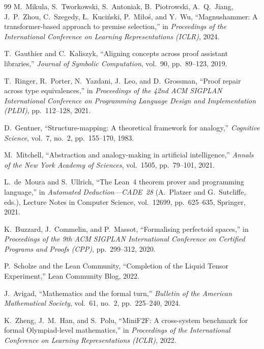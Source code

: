 \documentclass[11pt]{article}
\theoremstyle{definition}
\theoremstyle{remark}
\begin{document}
\begin{thebibliography}{99}
M.~Mikula, S.~Tworkowski, S.~Antoniak, B.~Piotrowski,
A.~Q.~Jiang, J.~P.~Zhou, C.~Szegedy, {\L}.~Kuci\'nski,
P.~Mi{\l}o{\'s}, and Y.~Wu,
``Magnushammer: A transformer-based approach to premise selection,''
in \emph{Proceedings of the International Conference on Learning
Representations (ICLR)}, 2024.

T.~Gauthier and C.~Kaliszyk,
``Aligning concepts across proof assistant libraries,''
\emph{Journal of Symbolic Computation}, vol.~90, pp.~89--123,
2019.

T.~Ringer, R.~Porter, N.~Yazdani, J.~Leo, and D.~Grossman,
``Proof repair across type equivalences,''
in \emph{Proceedings of the 42nd ACM SIGPLAN International
Conference on Programming Language Design and Implementation
(PLDI)}, pp.~112--128, 2021.

D.~Gentner,
``Structure-mapping: A theoretical framework for analogy,''
\emph{Cognitive Science}, vol.~7, no.~2, pp.~155--170, 1983.

M.~Mitchell,
``Abstraction and analogy-making in artificial intelligence,''
\emph{Annals of the New York Academy of Sciences}, vol.~1505,
pp.~79--101, 2021.

L.~de~Moura and S.~Ullrich,
``The Lean~4 theorem prover and programming language,''
in \emph{Automated Deduction---CADE~28}
(A.~Platzer and G.~Sutcliffe, eds.),
Lecture Notes in Computer Science, vol.~12699, pp.~625--635,
Springer, 2021.

K.~Buzzard, J.~Commelin, and P.~Massot,
``Formalising perfectoid spaces,''
in \emph{Proceedings of the 9th ACM SIGPLAN International
Conference on Certified Programs and Proofs (CPP)},
pp.~299--312, 2020.

P.~Scholze and the Lean Community,
``Completion of the Liquid Tensor Experiment,''
Lean Community Blog, 2022.

J.~Avigad,
``Mathematics and the formal turn,''
\emph{Bulletin of the American Mathematical Society}, vol.~61,
no.~2, pp.~225--240, 2024.

K.~Zheng, J.~M.~Han, and S.~Polu,
``MiniF2F: A cross-system benchmark for formal Olympiad-level
mathematics,''
in \emph{Proceedings of the International Conference on Learning
Representations (ICLR)}, 2022.


\end{thebibliography}
\end{document}
